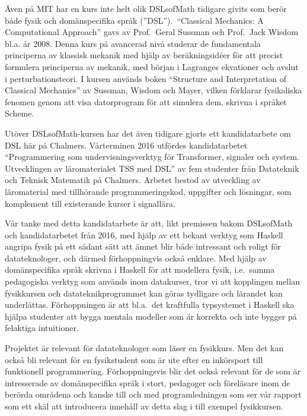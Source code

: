 Även på MIT har en kurs inte helt olik DSLsofMath tidigare givits som berör både
fysik och domänspecifika språk (''DSL'').\ ``Classical Mechanics: A Computational Approach'' gavs av
Prof.\ Geral Sussman och Prof.\ Jack Wisdom bl.a. år
2008.\cite{classical-mechanics-course-mit-2008}
Denna kurs på avancerad nivå studerar de fundamentala principerna av klassisk
mekanik med hjälp av beräkningsidéer för att precist formulera principerna av
mekanik, med början i Lagranges ekvationer och avslut i
perturbationsteori. I kursen används boken ``Structure and
Interpretation of Classical Mechanics'' av Sussman, Wisdom och Mayer,
vilken förklarar fysikaliska fenomen genom att visa datorprogram för att
simulera dem, skrivna i språket Scheme.\cite{SICM}

Utöver DSLsofMath-kursen har det även tidigare gjorts ett kandidatarbete om DSL 
här på Chalmers. Vårterminen 2016 utfördes kandidatarbetet
``Programmering som undervisningsverktyg för Transformer, signaler och
system. Utvecklingen av läromaterialet TSS med DSL'' av fem studenter
från Datateknik och Teknisk Matematik på Chalmers. Arbetet bestod av
utveckling av läromaterial med tillhörande programmeringskod,
uppgifter och lösningar, som komplement till existerande kurser i
signallära.\cite{kandidat2016}

Vår tanke med detta kandidatarbete är att, likt premissen bakom DSLsofMath
och kandidatarbetet från 2016, med hjälp av ett bekant verktyg
som Haskell angripa fysik på ett sådant sätt att ämnet blir både
intressant och roligt för datateknologer, och därmed förhoppningvis
också enklare. Med hjälp av domänspecifika språk skrivna i Haskell för att
modellera fysik, i.e.\ samma pedagogiska verktyg som används inom
datakurser, tror vi att kopplingen mellan fysikkursen och
datateknikprogrammet kan göras tydligare och lärandet kan underlättas.
Förhoppningen är att bl.a.\ det kraftfulla typsystemet i Haskell ska
hjälpa studenter att bygga mentala modeller som är korrekta och inte
bygger på felaktiga intuitioner.

Projektet är relevant för datateknologer som läser en fysikkurs. Men
det kan också bli relevant för en fysikstudent som är ute efter en
inkörsport till funktionell programmering. Förhoppningsvis blir det
också relevant för de som är intresserade av domänspecifika språk i
stort, pedagoger och föreläsare inom de berörda områdena och kanske
till och med programledningen som ser vår rapport som ett skäl att
introducera innehåll av detta slag i till exempel fysikkursen.

